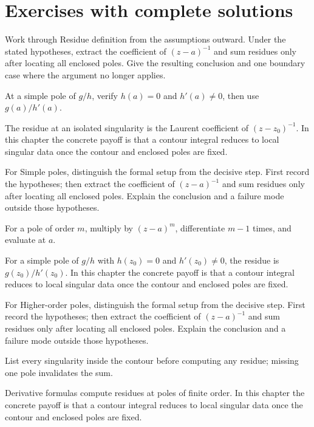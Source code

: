\section{Exercises with complete solutions}

\begin{exercise}\label{exr:iv10-01}
Work through Residue definition from the assumptions outward. Under the stated hypotheses, extract the coefficient of \((z-a)^{-1}\) and sum residues only after locating all enclosed poles. Give the resulting conclusion and one boundary case where the argument no longer applies.
\end{exercise}
\begin{hint}
At a simple pole of \(g/h\), verify \(h(a)=0\) and \(h'(a)\ne0\), then use \(g(a)/h'(a)\).
\end{hint}
\begin{solution}
The residue at an isolated singularity is the Laurent coefficient of $(z-z_0)^{-1}$. In this chapter the concrete payoff is that a contour integral reduces to local singular data once the contour and enclosed poles are fixed.
\end{solution}

\begin{exercise}\label{exr:iv10-02}
For Simple poles, distinguish the formal setup from the decisive step. First record the hypotheses; then extract the coefficient of \((z-a)^{-1}\) and sum residues only after locating all enclosed poles. Explain the conclusion and a failure mode outside those hypotheses.
\end{exercise}
\begin{hint}
For a pole of order \(m\), multiply by \((z-a)^m\), differentiate \(m-1\) times, and evaluate at \(a\).
\end{hint}
\begin{solution}
For a simple pole of $g/h$ with $h(z_0)=0$ and $h'(z_0)\ne0$, the residue is $g(z_0)/h'(z_0)$. In this chapter the concrete payoff is that a contour integral reduces to local singular data once the contour and enclosed poles are fixed.
\end{solution}

\begin{exercise}\label{exr:iv10-03}
For Higher-order poles, distinguish the formal setup from the decisive step. First record the hypotheses; then extract the coefficient of \((z-a)^{-1}\) and sum residues only after locating all enclosed poles. Explain the conclusion and a failure mode outside those hypotheses.
\end{exercise}
\begin{hint}
List every singularity inside the contour before computing any residue; missing one pole invalidates the sum.
\end{hint}
\begin{solution}
Derivative formulas compute residues at poles of finite order. In this chapter the concrete payoff is that a contour integral reduces to local singular data once the contour and enclosed poles are fixed.
\end{solution}


